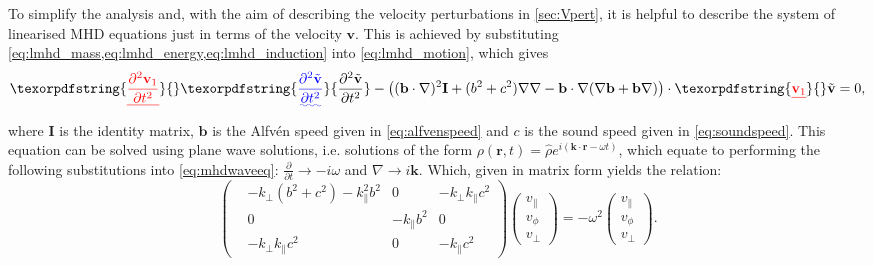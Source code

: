 \documentclass[a4paper,12pt,fourier,authoryear,custommargin]{Classes/PhDThesisPSnPDF}
\renewcommand{\vec}{\mathbf}
\providecommand{\DIFaddtex}[1]{{\protect\color{blue}\uwave{#1}}} %
\providecommand{\DIFdeltex}[1]{{\protect\color{red}\sout{#1}}}                      %
\providecommand{\DIFaddbegin}{} %
\providecommand{\DIFaddend}{} %
\providecommand{\DIFdelbegin}{} %
\providecommand{\DIFdelend}{} %
\providecommand{\DIFadd}[1]{\texorpdfstring{\DIFaddtex{#1}}{#1}} %
\providecommand{\DIFdel}[1]{\texorpdfstring{\DIFdeltex{#1}}{}} %
\begin{document}
To simplify the analysis and, with the aim of describing the velocity perturbations in \cref{sec:Vpert}, it is helpful to describe the system of linearised MHD equations just in terms of the velocity $\vec{v}$.
This is achieved by substituting \cref{eq:lmhd_mass,eq:lmhd_energy,eq:lmhd_induction} into \cref{eq:lmhd_motion}, which gives
\begin{equation}
    \DIFdelbegin \DIFdel{\frac{\partial^2 \vec{v}_1}{\partial t^2} }\DIFdelend \DIFaddbegin \DIFadd{\frac{\partial^2 \tilde{\vec{v}}}{\partial t^2} }\DIFaddend - \left( (\vec{b} \cdot \nabla)^2 \vec{I} + (b^2 + c^2) \nabla\nabla - \vec{b} \cdot \nabla (\nabla\vec{b} + \vec{b}\nabla) \right) \cdot \DIFdelbegin \DIFdel{\vec{v}_1 }\DIFdelend \DIFaddbegin \tilde{\vec{v}} \DIFaddend = 0,\label{eq:mhdwaveeq}
\end{equation}
where $\vec{I}$ is the identity matrix, $\vec{b}$ is the Alfv\'en speed given in \cref{eq:alfvenspeed} and $c$ is the sound speed given in \cref{eq:soundspeed}\DIFaddbegin \DIFadd{~}\DIFaddend \citep{goedbloed2004}.
This equation can be solved using plane wave solutions, i.e. solutions of the form $\rho(\vec{r}, t) = \hat{\rho} e^{i(\vec{k}\cdot\vec{r} - \omega t)}$, which equate to performing the following substitutions into \cref{eq:mhdwaveeq}: $\frac{\partial}{\partial t} \rightarrow - i \omega$ and $\nabla \rightarrow i \vec{k}$.
Which, given in matrix form yields the relation:
\begin{equation}
\begin{pmatrix}
    &-k_\perp(b^2+c^2)-k_\parallel^2 b^2			& 0			& -k_\perp k_\parallel c^2\\
    & 0									&-k_\parallel b^2	& 0\\
    &-k_\perp k_\parallel c^2					& 0			& -k_\parallel c^2
\end{pmatrix}
\DIFdelbegin %
\DIFdelend \DIFaddbegin \begin{pmatrix}
v_\parallel\\
v_\phi\\
v_\perp
\end{pmatrix}
\DIFaddend = - \omega^2
\DIFdelbegin %
\DIFdelend \DIFaddbegin \begin{pmatrix}
v_\parallel\\
v_\phi\\
v_\perp
\end{pmatrix}\DIFaddend .\label{eq:eigenvalue}
\end{equation}
\end{document}
